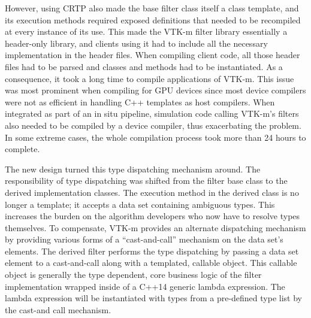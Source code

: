 
However, using CRTP also made the base filter class itself a class template, and its execution methods required exposed definitions that needed to be recompiled at every instance of its use.
This made the VTK-m filter library essentially a header-only library, and clients using it had to include all the necessary implementation in the header files.
When compiling client code, all those header files had to be parsed and classes and methods had to be instantiated.
As a consequence, it took a long time to compile applications of VTK-m.
This issue was most prominent when compiling for GPU devices since most device compilers were not as efficient in handling C++ templates as host compilers.
When integrated as part of an in situ pipeline, simulation code calling VTK-m's filters also needed to be compiled by a device compiler, thus exacerbating the problem.
In some extreme cases, the whole compilation process took more than 24 hours to complete.

The new design turned this type dispatching mechanism around.
The responsibility of type dispatching was shifted from the filter base class to the derived implementation classes.
The execution method in the derived class is no longer a template; it accepts a data set containing ambiguous types.
This increases the burden on the algorithm developers who now have to resolve types themselves.
To compensate, VTK-m provides an alternate dispatching mechanism by providing various forms of a ``cast-and-call'' mechanism on the data set's elements.
The derived filter performs the type dispatching by passing a data set element to a cast-and-call along with a templated, callable object.
This callable object is generally the type dependent, core business logic of the filter implementation wrapped inside of a C++14 generic lambda expression.
The lambda expression will be instantiated with types from a pre-defined type list by the cast-and call mechanism.

